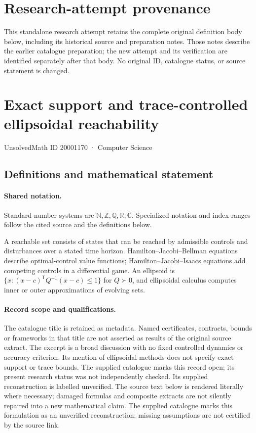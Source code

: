 \documentclass[11pt]{article}
\begin{document}
\section*{Research-attempt provenance}
This standalone research attempt retains the complete original definition body below,
including its historical source and preparation notes. Those notes describe the
earlier catalogue preparation; the new attempt and its verification are identified
separately after that body. No original ID, catalogue status, or source statement is changed.

\section{Exact support and trace-controlled ellipsoidal reachability}\label{20001170}
{\small UnsolvedMath ID 20001170 · Computer Science}
\subsection{Definitions and mathematical statement}

\paragraph{Shared notation.}Standard number systems are $\mathbb N,\mathbb Z,\mathbb Q,\mathbb R,\mathbb C$. Specialized notation and index ranges follow the cited source and the definitions below.


A reachable set consists of states that can be reached by admissible controls and disturbances over a stated time horizon. Hamilton--Jacobi--Bellman equations describe optimal-control value functions; Hamilton--Jacobi--Isaacs equations add competing controls in a differential game. An ellipsoid is $\{x:(x-c)^{\mathsf T}Q^{-1}(x-c)\leq1\}$ for $Q\succ0$, and ellipsoidal calculus computes inner or outer approximations of evolving sets.
\paragraph{Record scope and qualifications.}
The catalogue title is retained as metadata. Named certificates, contracts, bounds or frameworks in that title are not asserted as results of the original source extract.
The excerpt is a broad discussion with no fixed controlled dynamics or accuracy criterion. Its mention of ellipsoidal methods does not specify exact support or trace bounds. The supplied catalogue marks this record open; its present research status was not independently checked. Its supplied reconstruction is labelled unverified.
The source text below is rendered literally where necessary; damaged formulas and composite extracts are not silently repaired into a new mathematical claim.
The supplied catalogue marks this formulation as an unverified reconstruction; missing assumptions are not certified by the source link.
\end{document}
